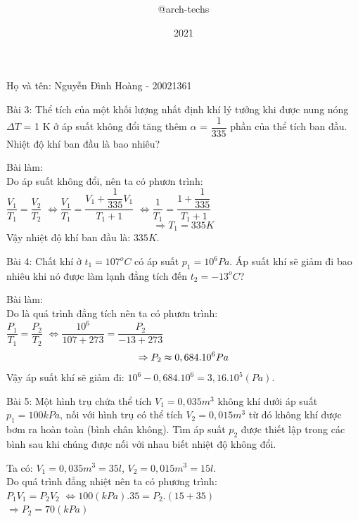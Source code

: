 \documentclass[12pt,a4paper]{report}
\title{\framebox {
        \textcolor{TEcolor}{
            \Huge {    AP/College Physics 1    }
        }
    }    }
\author{\Large @arch-techs}
\date{2021}
\begin{document}
{\selectfont

\begin{center}
    \framebox{
      \Large \textcolor{TEcolor}{BTVN: Chương 5: Nhiệt Động Lực Học Chất Khí}
}
\newline

      \textcolor{TEcolor}{Họ và tên: Nguyễn Đình Hoàng - 20021361}
\end{center}

Bài 3: Thể tích của một khối lượng nhất định khí lý tưởng khi được nung nóng
$\varDelta T$ = 1 K ở áp suất không đổi tăng thêm $\alpha $ = $\dfrac{1}{335}$ phần của thể tích ban đầu.
Nhiệt độ khí ban đầu là bao nhiêu?
\begin{center}
    Bài làm: \\
    Do áp suất không đổi, nên ta có phươn trình: \\
    $\dfrac{V_{1}}{T_{1}} = \dfrac{V_{2}}{T_{2}}$
    $\Leftrightarrow  \dfrac{V_{1}}{T_{1}} = \dfrac{V_{1} + \dfrac{1}{335}V_{1}}{T_{1} + 1}$
    $\Leftrightarrow  \dfrac{1}{T_{1}} = \dfrac{1 + \dfrac{1}{335}}{T_{1} + 1}$
    \[\Rightarrow T_{1} = 335K\] 
    Vậy nhiệt độ khí ban đầu là: $335K$.

\end{center}

Bài 4: Chất khí ở $t_{1} = 107^o C $ có áp suất $p_{1} = 10^6 Pa.$ Áp suất khí sẽ giảm đi bao
nhiêu khi nó được làm lạnh đẳng tích đến $t_{2} = -13^o C$?
\begin{center}
    Bài làm: \\
    Do là quá trình đẳng tích nên ta có phươn trình: \\
    $\dfrac{P_{1}}{T_{1}} = \dfrac{P_{2}}{T_{2}}$
    $\Leftrightarrow  \dfrac{10^6}{107 + 273} = \dfrac{P_{2}}{-13 + 273}$
    \[\Rightarrow P_{2} \thickapprox 0,684.10^6 Pa\] 
    Vậy áp suất khí sẽ giảm đi: $10^6 - 0,684.10^6 = 3,16.10^5 (Pa)$.

\end{center}

Bài 5: Một hình trụ chứa thể tích $V_{1} = 0,035 m^3$ không khí dưới áp suất $p_{1} = 100kPa$, nối với hình trụ có thể tích $V_{2} = 0,015 m^3$
từ đó không khí được bơm ra hoàn toàn (bình chân không). Tìm áp suất $p_{2}$ được thiết lập trong các bình sau
khi chúng được nối với nhau biết nhiệt độ không đổi.

\begin{center}
    Ta có: $V_{1} = 0,035 m^3 = 35l$, $V_{2} = 0,015 m^3 = 15l$. \\
    Do quá trình đẳng nhiệt nên ta có phương trình: \\
    $P_{1}V_{1} = P_{2}V_{2}$
    $\Leftrightarrow 100(kPa).35 = P_{2}.(15 + 35)$ \\
    $\Rightarrow P_{2} = 70 (kPa)$
\end{center}

}
\end{document}

